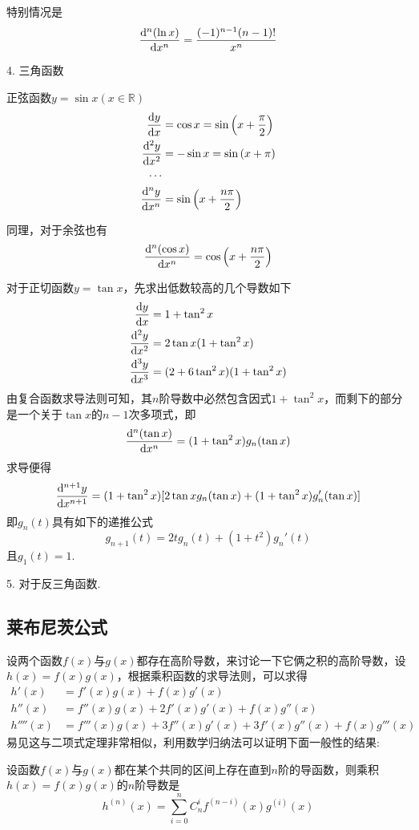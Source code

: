 特别情况是
\[ \frac{\mathop{}\!\mathrm{d}^n (\ln{x})}{\mathop{}\!\mathrm{d} x^n} = \frac{(-1)^{n-1}(n-1)!}{x^n} \]

4. 三角函数

正弦函数$y=\sin{x}(x \in \mathbb{R})$
\begin{align*}
  \frac{\mathop{}\!\mathrm{d} y}{\mathop{}\!\mathrm{d} x} & = \cos{x} = \sin{\left( x+\frac{\pi}{2} \right)} \\
  \frac{\mathop{}\!\mathrm{d}^2 y}{\mathop{}\!\mathrm{d} x^2} & = -\sin{x} = \sin{(x+\pi)} \\
  \cdots \\
  \frac{\mathop{}\!\mathrm{d}^ny}{\mathop{}\!\mathrm{d} x^n} & = \sin{\left( x+\frac{n\pi}{2} \right)}
\end{align*}

同理，对于余弦也有
\[ \frac{\mathop{}\!\mathrm{d}^n (\cos{x})}{\mathop{}\!\mathrm{d} x^n} = \cos{\left( x+\frac{n\pi}{2} \right)} \]

对于正切函数$y=\tan{x}$，先求出低数较高的几个导数如下
\begin{align*}
  \frac{\mathop{}\!\mathrm{d} y}{\mathop{}\!\mathrm{d} x} & = 1+\tan^2{x} \\
  \frac{\mathop{}\!\mathrm{d}^2 y}{\mathop{}\!\mathrm{d} x^2} & = 2\tan{x}(1+\tan^2{x}) \\
  \frac{\mathop{}\!\mathrm{d}^3y}{\mathop{}\!\mathrm{d} x^3} & = (2+6\tan^2{x})(1+\tan^2{x})
\end{align*}
由复合函数求导法则可知，其$n$阶导数中必然包含因式$1+\tan^2{x}$，而剩下的部分是一个关于$\tan{x}$的$n-1$次多项式，即
\[ \frac{\mathop{}\!\mathrm{d}^n (\tan{x})}{\mathop{}\!\mathrm{d} x^n} = (1+\tan^2{x})g_n(\tan{x}) \]
求导便得
\[ \frac{\mathop{}\!\mathrm{d}^{n+1}y}{\mathop{}\!\mathrm{d} x^{n+1}} = (1+\tan^2{x})[2\tan{x}g_n(\tan{x})+(1+\tan^2{x})g_n'(\tan{x})] \]
即$g_n(t)$具有如下的递推公式
\[ g_{n+1}(t) = 2tg_n(t)+(1+t^2)g_n'(t) \]
且$g_1(t)=1$.

5. 对于反三角函数.

\subsection{莱布尼茨公式}
\label{sec:Leibniz-formular-for-high-level-derivative-of-multiply}

设两个函数$f(x)$与$g(x)$都存在高阶导数，来讨论一下它俩之积的高阶导数，设$h(x)=f(x)g(x)$，根据乘积函数的求导法则，可以求得
\begin{align*}
  h'(x) & = f'(x)g(x)+f(x)g'(x) \\
  h''(x) & = f''(x)g(x)+2f'(x)g'(x)+f(x)g''(x) \\
  h''''(x) & = f'''(x)g(x)+3f''(x)g'(x)+3f'(x)g''(x)+f(x)g'''(x)
\end{align*}
易见这与二项式定理非常相似，利用数学归纳法可以证明下面一般性的结果:

\begin{theorem}
  设函数$f(x)$与$g(x)$都在某个共同的区间上存在直到$n$阶的导函数，则乘积$h(x)=f(x)g(x)$的$n$阶导数是
  \[ h^{(n)}(x) = \sum_{i=0}^n C_n^i f^{(n-i)}(x)g^{(i)}(x) \]
\end{theorem}

